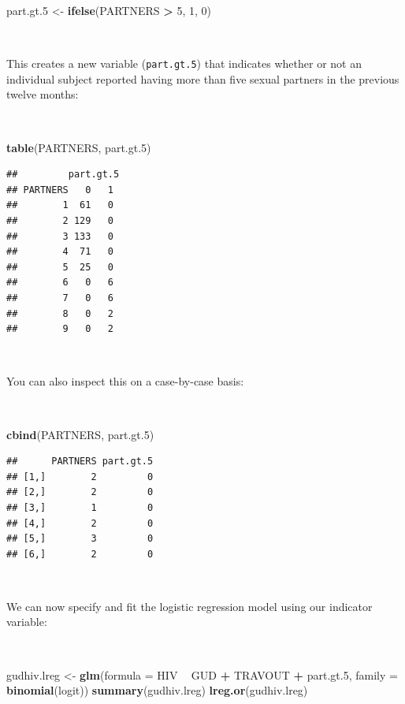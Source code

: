 \documentclass[12pt,a4paper]{book}
\newenvironment{Shaded}{\begin{snugshade}}{\end{snugshade}}
\newcommand{\KeywordTok}[1]{\textcolor[rgb]{0.13,0.29,0.53}{\textbf{#1}}}
\newcommand{\DataTypeTok}[1]{\textcolor[rgb]{0.13,0.29,0.53}{#1}}
\newcommand{\DecValTok}[1]{\textcolor[rgb]{0.00,0.00,0.81}{#1}}
\newcommand{\FloatTok}[1]{\textcolor[rgb]{0.00,0.00,0.81}{#1}}
\newcommand{\StringTok}[1]{\textcolor[rgb]{0.31,0.60,0.02}{#1}}
\newcommand{\OperatorTok}[1]{\textcolor[rgb]{0.81,0.36,0.00}{\textbf{#1}}}
\newcommand{\NormalTok}[1]{#1}
\theoremstyle{definition}
\theoremstyle{definition}
\theoremstyle{definition}
\theoremstyle{remark}
\begin{document}
\begin{Shaded}
\begin{Highlighting}[]
\NormalTok{part.gt}\FloatTok{.5}\NormalTok{ <-}\StringTok{ }\KeywordTok{ifelse}\NormalTok{(PARTNERS }\OperatorTok{>}\StringTok{ }\DecValTok{5}\NormalTok{, }\DecValTok{1}\NormalTok{, }\DecValTok{0}\NormalTok{)}
\end{Highlighting}
\end{Shaded}

~

This creates a new variable (\texttt{part.gt.5}) that indicates whether
or not an individual subject reported having more than five sexual
partners in the previous twelve months:

~

\begin{Shaded}
\begin{Highlighting}[]
\KeywordTok{table}\NormalTok{(PARTNERS, part.gt}\FloatTok{.5}\NormalTok{)}
\end{Highlighting}
\end{Shaded}

\begin{verbatim}
##         part.gt.5
## PARTNERS   0   1
##        1  61   0
##        2 129   0
##        3 133   0
##        4  71   0
##        5  25   0
##        6   0   6
##        7   0   6
##        8   0   2
##        9   0   2
\end{verbatim}

~

You can also inspect this on a case-by-case basis:

~

\begin{Shaded}
\begin{Highlighting}[]
\KeywordTok{cbind}\NormalTok{(PARTNERS, part.gt}\FloatTok{.5}\NormalTok{)}
\end{Highlighting}
\end{Shaded}

\begin{verbatim}
##      PARTNERS part.gt.5
## [1,]        2         0
## [2,]        2         0
## [3,]        1         0
## [4,]        2         0
## [5,]        3         0
## [6,]        2         0
\end{verbatim}

~

We can now specify and fit the logistic regression model using our
indicator variable:

~

\begin{Shaded}
\begin{Highlighting}[]
\NormalTok{gudhiv.lreg <-}\StringTok{ }\KeywordTok{glm}\NormalTok{(}\DataTypeTok{formula =}\NormalTok{ HIV }\OperatorTok{~}\StringTok{ }\NormalTok{GUD }\OperatorTok{+}\StringTok{ }\NormalTok{TRAVOUT }\OperatorTok{+}\StringTok{ }\NormalTok{part.gt}\FloatTok{.5}\NormalTok{,}
                   \DataTypeTok{family =} \KeywordTok{binomial}\NormalTok{(logit))}
\KeywordTok{summary}\NormalTok{(gudhiv.lreg)}
\KeywordTok{lreg.or}\NormalTok{(gudhiv.lreg)}
\end{Highlighting}
\end{Shaded}
\end{document}
